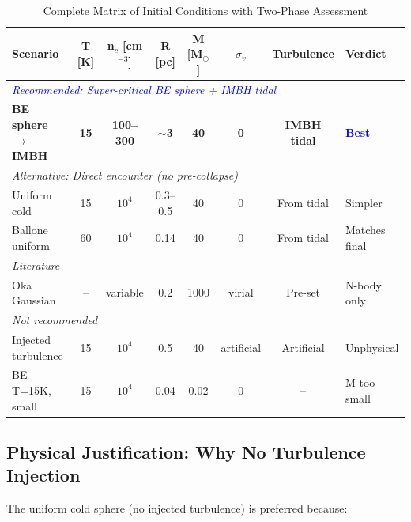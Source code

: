 \documentclass[11pt,a4paper]{article}
\begin{document}
\begin{table}[h]
\centering
\caption{Complete Matrix of Initial Conditions with Two-Phase Assessment}
\footnotesize
\begin{tabular}{lccccccl}
\toprule
\textbf{Scenario} & \textbf{T [K]} & \textbf{n$_c$ [cm$^{-3}$]} & \textbf{R [pc]} & \textbf{M [M$_\odot$]} & \textbf{$\sigma_v$} & \textbf{Turbulence} & \textbf{Verdict} \\
\midrule
\multicolumn{8}{l}{\textit{\textcolor{blue}{Recommended: Super-critical BE sphere + IMBH tidal}}} \\
\textbf{BE sphere $\to$ IMBH} & \textbf{15} & \textbf{100--300} & \textbf{$\sim$3} & \textbf{40} & \textbf{0} & \textbf{IMBH tidal} & \textcolor{blue}{\textbf{Best}} \\
\midrule
\multicolumn{8}{l}{\textit{Alternative: Direct encounter (no pre-collapse)}} \\
Uniform cold & 15 & $10^4$ & 0.3--0.5 & 40 & 0 & From tidal & Simpler \\
Ballone uniform & 60 & $10^4$ & 0.14 & 40 & 0 & From tidal & Matches final \\
\midrule
\multicolumn{8}{l}{\textit{Literature}} \\
Oka Gaussian & -- & variable & 0.2 & 1000 & virial & Pre-set & N-body only \\
\midrule
\multicolumn{8}{l}{\textit{Not recommended}} \\
Injected turbulence & 15 & $10^4$ & 0.5 & 40 & artificial & Artificial & Unphysical \\
BE T=15K, small & 15 & $10^4$ & 0.04 & 0.02 & 0 & -- & M too small \\
\bottomrule
\end{tabular}
\end{table}

\subsection{Physical Justification: Why No Turbulence Injection}

The uniform cold sphere (no injected turbulence) is preferred because:
\end{document}
